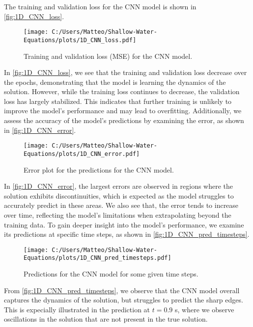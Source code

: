 The training and validation loss for the CNN model is shown in \autoref{fig:1D_CNN_loss}.
\begin{figure}[H]
    \centering
    \texttt{[image: C:/Users/Matteo/Shallow-Water-Equations/plots/1D\_CNN\_loss.pdf]}
    \caption{Training and validation loss (MSE) for the CNN model.}\label{fig:1D_CNN_loss}
\end{figure}
In \autoref{fig:1D_CNN_loss}, we see that the training and validation loss decrease over the epochs, demonstrating that the model is learning the dynamics of the solution.
However, while the training loss continues to decrease, the validation loss has largely stabilized.
This indicates that further training is unlikely to improve the model's performance and may lead to overfitting.
Additionally, we assess the accuracy of the model's predictions by examining the error, as shown in \autoref{fig:1D_CNN_error}.
\begin{figure}[H]
    \centering
    \texttt{[image: C:/Users/Matteo/Shallow-Water-Equations/plots/1D\_CNN\_error.pdf]}
    \caption{Error plot for the predictions for the CNN model.}\label{fig:1D_CNN_error}
\end{figure}
In \autoref{fig:1D_CNN_error}, the largest errors are observed in regions where the solution exhibits discontinuities, which is expected as the model struggles to accurately predict in these areas.
We also see that, the error tends to increase over time, reflecting the model's limitations when extrapolating beyond the training data.
To gain deeper insight into the model's performance, we examine its predictions at specific time steps, as shown in \autoref{fig:1D_CNN_pred_timesteps}.
\begin{figure}[H]
    \centering
    \texttt{[image: C:/Users/Matteo/Shallow-Water-Equations/plots/1D\_CNN\_pred\_timesteps.pdf]}
    \caption{Predictions for the CNN model for some given time steps.}\label{fig:1D_CNN_pred_timesteps}
\end{figure}
From \autoref{fig:1D_CNN_pred_timesteps}, we observe that the CNN model overall captures the dynamics of the solution, but struggles to predict the sharp edges.
This is expecially illustrated in the prediction at $t = 0.9$ s, where we observe oscillations in the solution that are not present in the true solution.


